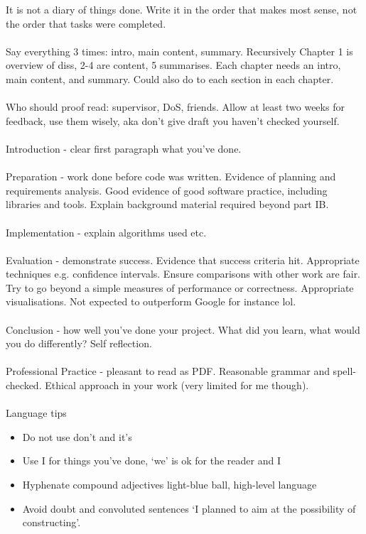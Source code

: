 \documentclass{report}
\begin{document}
It is not a diary of things done. Write it in the order that makes most sense, not the order that tasks were completed.
\\\\
Say everything 3 times: intro, main content, summary. Recursively
Chapter 1 is overview of diss, 2-4 are content, 5 summarises.
Each chapter needs an intro, main content, and summary. Could also do to each section in each chapter.
\\\\
Who should proof read: supervisor, DoS, friends. Allow at least two weeks for feedback, use them wisely, aka don't give draft you haven't checked yourself.
\\\\
Introduction - clear first paragraph what you've done.
\\\\
Preparation -
work done before code was written. Evidence of planning and requirements analysis. Good evidence of good software practice, including libraries and tools. Explain background material required beyond part IB.
\\\\
Implementation - explain algorithms used etc.
\\\\
Evaluation - demonstrate success. Evidence that success criteria hit. Appropriate techniques e.g. confidence intervals. Ensure comparisons with other work are fair. Try to go beyond a simple measures of performance or correctness. Appropriate visualisations. Not expected to outperform Google for instance lol.
\\\\
Conclusion - how well you've done your project. What did you learn, what would you do differently? Self reflection.
\\\\
Professional Practice - pleasant to read as PDF. Reasonable grammar and spell-checked. Ethical approach in your work (very limited for me though).
\\\\
Language tips
\begin{itemize}
	\item Do not use don't and it's
	\item Use I for things you've done, `we' is ok for the reader and I
	\item Hyphenate compound adjectives light-blue ball, high-level language
	\item Avoid doubt and convoluted sentences `I planned to aim at the possibility of constructing'.
\end{itemize}
\end{document}
